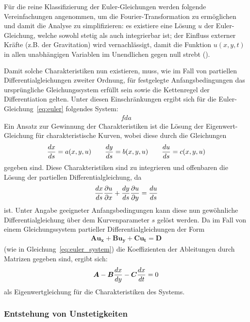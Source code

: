 Für die reine Klassifizierung der Euler-Gleichungen werden folgende Vereinfachungen angenommen, um die Fourier-Transformation zu ermöglichen und damit die Analyse zu simplifizieren: es existiere eine Lösung $u$ der Euler-Gleichung, welche sowohl stetig als auch integrierbar ist; der Einfluss externer Kräfte (z.B. der Gravitation) wird vernachlässigt, damit die Funktion $u(x,y,t)$ in allen unabhängigen Variablen im Unendlichen gegen null strebt (\cite[nach][S. 802]{bronstejn_taschenbuch_2020}).


Damit solche Charakteristiken nun existieren, muss, wie im Fall von partiellen Differentialgleichungen zweiter Ordnung, für festgelegte Anfangsbedingungen das ursprüngliche Gleichungssystem erfüllt sein sowie die Kettenregel der Differentiation gelten. Unter diesen Einschränkungen ergibt sich für die Euler-Gleichung~\eqref{eq:euler} folgendes System:
\begin{align*}
    fda
\end{align*}
Ein Ansatz zur Gewinnung der Charakteristiken ist die Lösung der Eigenwert-Gleichung für charakteristische Kurven, wobei diese durch die Gleichungen
\begin{align}
    \frac{d x}{d s} = a(x,y,u) \qquad \frac{d y}{d s}=b(x,y,u) \qquad \frac{d u}{d s} = c(x,y,u)
\end{align}
gegeben sind. Diese Charakteristiken sind zu integrieren und offenbaren die Lösung der partiellen Differentialgleichung, da
\begin{align*}
    \frac{d x}{d s} \frac{\partial u}{\partial x} + \frac{d y}{d s} \frac{\partial u}{\partial y} = \frac{d u}{d s}
\end{align*}
ist. Unter Angabe geeigneter Anfangsbedingungen kann diese nun gewöhnliche Differentialgleichung über dem Kurvenparameter $s$ gelöst werden. Da im Fall von einem Gleichungssystem partieller Differentialgleichungen der Form
\begin{align*}
    \boldsymbol{Au_x} + \boldsymbol{Bu_y} + \boldsymbol{Cu_t} = \boldsymbol{D}
\end{align*}
(wie in Gleichung~\eqref{eq:euler_system}) die Koeffizienten der Ableitungen durch Matrizen gegeben sind, ergibt sich:
\begin{align*}
    \boldsymbol{A}-\boldsymbol{B}\frac{d x}{d y} - \boldsymbol{C}\frac{d x}{d t} = 0
\end{align*}
als Eigenwertgleichung für die Charakteristiken des Systems.

\subsubsection{Entstehung von Unstetigkeiten}

